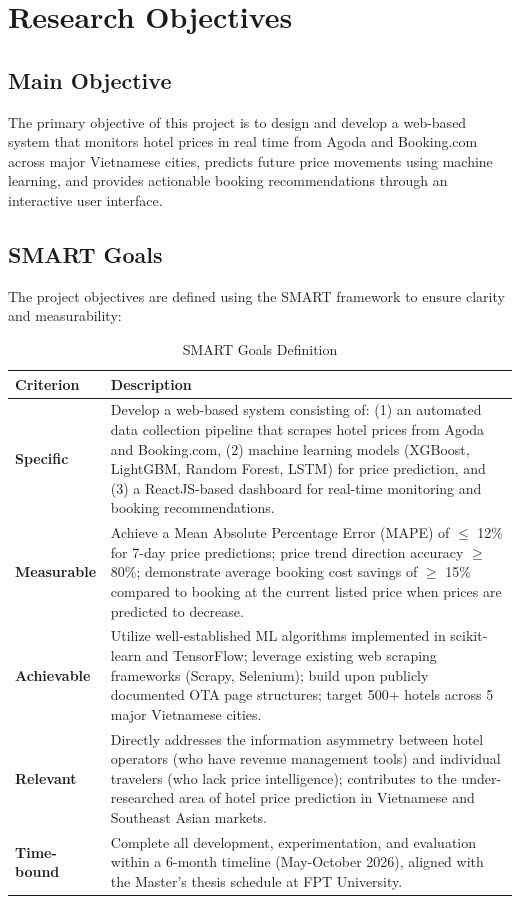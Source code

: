 \documentclass[12pt,a4paper]{report}
\begin{document}
\section{Research Objectives}

\subsection{Main Objective}

The primary objective of this project is to design and develop a web-based system that monitors hotel prices in real time from Agoda and Booking.com across major Vietnamese cities, predicts future price movements using machine learning, and provides actionable booking recommendations through an interactive user interface.

\subsection{SMART Goals}

The project objectives are defined using the SMART framework to ensure clarity and measurability:

\begin{table}[H]
\centering
\caption{SMART Goals Definition}
\label{tab:smart_goals}
\begin{tabular}{|p{2.5cm}|p{10cm}|}
\hline
\textbf{Criterion} & \textbf{Description} \\
\hline
\textbf{Specific} & Develop a web-based system consisting of: (1) an automated data collection pipeline that scrapes hotel prices from Agoda and Booking.com, (2) machine learning models (XGBoost, LightGBM, Random Forest, LSTM) for price prediction, and (3) a ReactJS-based dashboard for real-time monitoring and booking recommendations. \\
\hline
\textbf{Measurable} & Achieve a Mean Absolute Percentage Error (MAPE) of $\leq$ 12\% for 7-day price predictions; price trend direction accuracy $\geq$ 80\%; demonstrate average booking cost savings of $\geq$ 15\% compared to booking at the current listed price when prices are predicted to decrease. \\
\hline
\textbf{Achievable} & Utilize well-established ML algorithms implemented in scikit-learn and TensorFlow; leverage existing web scraping frameworks (Scrapy, Selenium); build upon publicly documented OTA page structures; target 500+ hotels across 5 major Vietnamese cities. \\
\hline
\textbf{Relevant} & Directly addresses the information asymmetry between hotel operators (who have revenue management tools) and individual travelers (who lack price intelligence); contributes to the under-researched area of hotel price prediction in Vietnamese and Southeast Asian markets. \\
\hline
\textbf{Time-bound} & Complete all development, experimentation, and evaluation within a 6-month timeline (May-October 2026), aligned with the Master's thesis schedule at FPT University. \\
\hline
\end{tabular}
\end{table}
\end{document}
